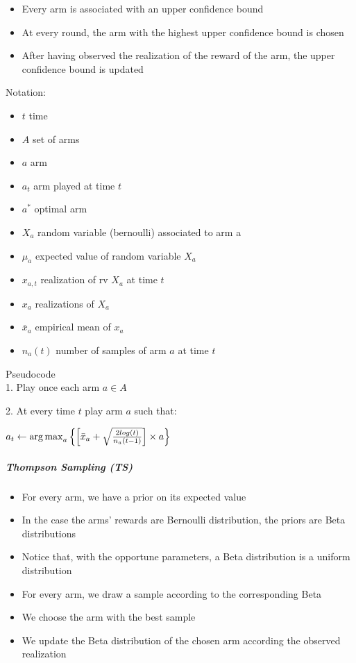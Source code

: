 \begin{itemize}
	\item Every arm is associated with an upper confidence bound 
	\item At every round, the arm with the highest upper confidence bound is chosen
	\item After having observed the realization of the reward of the arm, the upper confidence bound is updated
\end{itemize}
Notation:\\
\begin{itemize}
\item $t$ time
\item $A$ set of arms
\item $a$ arm
\item $a_{t}$ arm played at time $t$
\item $a^*$ optimal arm
\item $X_{a}$ random variable (bernoulli) associated to arm a
\item $\mu_{a}$ expected value of random variable $X_{a}$
\item $x_{a,t}$ realization of rv $X_{a}$ at time $t$
\item $x_{a}$ realizations of $X_{a}$
\item $\bar{x}_{a}$ empirical mean of $x_{a}$
\item $n_{a}(t)$ number of samples of arm $a$ at time $t$
\end{itemize}

Pseudocode\\

1. Play once each arm $a \in A$

2. At every time $t$ play arm $a$ such that:

\hspace{2em}$a_{t} \leftarrow \operatorname{arg\,max}_a{\left\{\left[\bar{x}_{a} + \sqrt{\frac{2 log(t)}{{n_{a}(t-1)}} }\right]\times a\right\}}$

\subparagraph*{Thompson Sampling (TS)}

\begin{itemize}
	\item For every arm, we have a prior on its expected value 
	\item In the case the arms’ rewards are Bernoulli distribution, the priors are Beta distributions
	\item Notice that, with the opportune parameters, a Beta distribution is a uniform distribution 
	\item For every arm, we draw a sample according to the corresponding Beta
	\item We choose the arm with the best sample 
	\item We update the Beta distribution of the chosen arm according the observed realization
\end{itemize}

